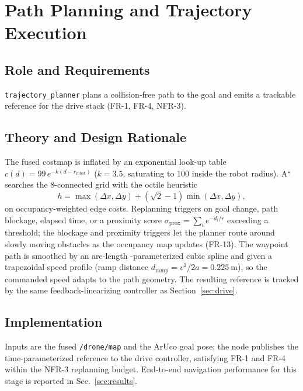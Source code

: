 \documentclass[conference]{IEEEtran}
\newcommand{\subsys}[1]{\texttt{#1}}      %
\begin{document}
\section{Path Planning and Trajectory Execution}
\label{sec:planner}

\subsection{Role and Requirements}
\subsys{trajectory\_planner} plans a collision-free path to the goal and emits a
trackable reference for the drive stack (FR-1, FR-4, NFR-3).

\subsection{Theory and Design Rationale}
The fused costmap is inflated by an exponential look-up table
$c(d)=99\,e^{-k(d-r_\text{robot})}$ ($k=3.5$, saturating to 100 inside the robot
radius). A$^\star$ searches the 8-connected grid with the octile heuristic
\begin{equation}
h=\max(\Delta x,\Delta y)+(\sqrt2-1)\min(\Delta x,\Delta y),
\end{equation}
on occupancy-weighted edge costs. Replanning triggers on goal change, path
blockage, elapsed time, or a proximity score $\sigma_\text{prox}=\sum_i
e^{-d_i/r}$ exceeding a threshold; the blockage and proximity triggers let the
planner route around slowly moving obstacles as the occupancy map updates (FR-13).
The waypoint path is smoothed by an arc-length
-parameterized cubic spline and given a trapezoidal speed profile (ramp distance
$d_\text{ramp}=v^2/2a=\SI{0.225}{\meter}$), so the commanded speed adapts to the
path geometry. The resulting reference is tracked by the same
feedback-linearizing controller as Section~\ref{sec:drive}.

\subsection{Implementation}
Inputs are the fused \texttt{/drone/map} and the ArUco goal pose; the node
publishes the time-parameterized reference to the drive controller, satisfying
FR-1 and FR-4 within the NFR-3 replanning budget. End-to-end navigation
performance for this stage is reported in Sec.~\ref{sec:results}.
\end{document}
